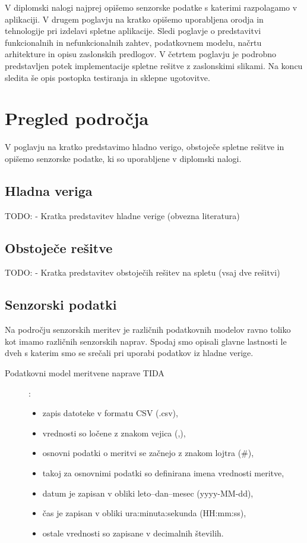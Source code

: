 \documentclass[a4paper, 12pt]{book}
\begin{document}
V diplomski nalogi najprej opišemo senzorske podatke s katerimi razpolagamo v aplikaciji. V drugem poglavju na kratko opišemo uporabljena orodja in tehnologije pri izdelavi spletne aplikacije. Sledi poglavje o predstavitvi funkcionalnih in nefunkcionalnih zahtev, podatkovnem modelu, načrtu arhitekture in opisu zaslonskih predlogov. V četrtem poglavju je podrobno predstavljen potek implementacije spletne rešitve z zaslonskimi slikami. Na koncu sledita še opis postopka testiranja in sklepne ugotovitve.



\chapter{Pregled področja}
\label{pregled-podrocja}

V poglavju na kratko predstavimo hladno verigo, obstoječe spletne rešitve in opišemo senzorske podatke, ki so uporabljene v diplomski nalogi.

\section{Hladna veriga}

TODO: -	Kratka predstavitev hladne verige (obvezna literatura)

\section{Obstoječe rešitve}

TODO: - Kratka predstavitev obstoječih rešitev na spletu (vsaj dve rešitvi)

\section{Senzorski podatki}

Na področju senzorskih meritev je različnih podatkovnih modelov ravno toliko kot imamo različnih senzorskih naprav. Spodaj smo opisali glavne lastnosti le dveh s katerim smo se srečali pri uporabi podatkov iz hladne verige.


\begin{description}
\item[Podatkovni model meritvene naprave TIDA]:
\begin{itemize}
\item  zapis datoteke v formatu CSV (.csv),
\item  vrednosti so ločene z znakom vejica (,),
\item  osnovni podatki o meritvi se začnejo z znakom lojtra (\#),
\item  takoj za osnovnimi podatki so definirana imena vrednosti meritve,
\item  datum je zapisan v obliki leto--dan--mesec (yyyy-MM-dd),
\item  čas je zapisan v obliki ura:minuta:sekunda (HH:mm:ss),
\item  ostale vrednosti so zapisane v decimalnih številih.
\end{itemize}
\end{description}
\end{document}
